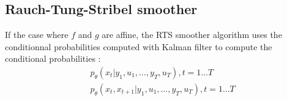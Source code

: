 \subsection{Rauch-Tung-Stribel smoother}

 \newline

If the case where $f$ and $g$ are affine, the RTS smoother algorithm uses the conditionnal probabilities computed with Kalman filter to compute the conditional probabilities :
\begin{align*}
  &p_{\theta}\left(x_t|y_1, u_1, \ldots, y_T, u_T \right ), t=1 \ldots T\\
  &p_{\theta}\left(x_t, x_{t+1}|y_1, u_1, \ldots, y_T, u_T \right ), t=1 \ldots T\\
\end{align*}
